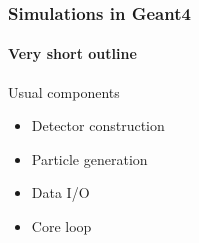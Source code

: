 \begin{frame}
\frametitle{Simulations in Geant4}
\framesubtitle{Very short outline}

\begin{block}{Usual components}
	\begin{itemize}
		\item Detector construction
		\item Particle generation
		\item Data I/O
		\item Core loop
	\end{itemize}
\end{block}

\end{frame}